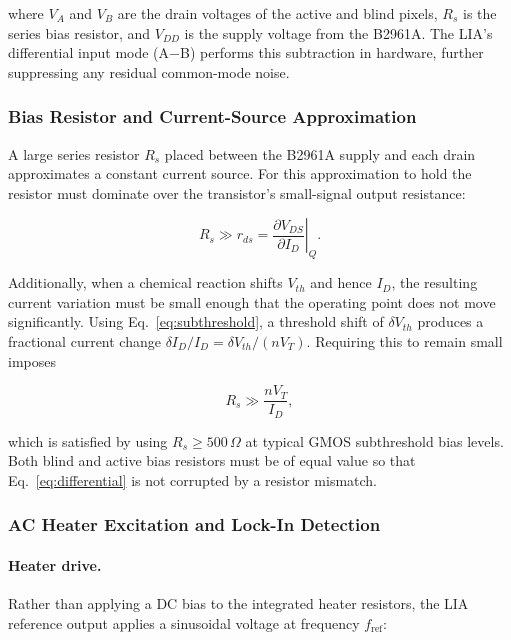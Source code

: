 \documentclass{report}
\begin{document}
where $V_A$ and $V_B$ are the drain voltages of the active and blind pixels,
$R_s$ is the series bias resistor, and $V_{DD}$ is the supply voltage from
the B2961A. The LIA's differential input mode (A$-$B) performs this
subtraction in hardware, further suppressing any residual common-mode noise.

\subsubsection{Bias Resistor and Current-Source Approximation}

A large series resistor $R_s$ placed between the B2961A supply and each drain
approximates a constant current source. For this approximation to hold the
resistor must dominate over the transistor's small-signal output resistance:

\begin{equation}
  R_s \gg r_{ds} = \left.\frac{\partial V_{DS}}{\partial I_D}\right|_{Q}.
  \label{eq:current_source_cond}
\end{equation}

Additionally, when a chemical reaction shifts $V_{th}$ and hence $I_D$, the
resulting current variation must be small enough that the operating point does
not move significantly. Using Eq.~\eqref{eq:subthreshold}, a threshold shift
of $\delta V_{th}$ produces a fractional current change
$\delta I_D / I_D = \delta V_{th} / (n V_T)$.
Requiring this to remain small imposes

\begin{equation}
  R_s \gg \frac{n V_T}{I_D},
  \label{eq:bias_stability}
\end{equation}

which is satisfied by using $R_s \geq 500\,\Omega$ at typical GMOS
subthreshold bias levels. Both blind and active bias resistors must be of
equal value so that Eq.~\eqref{eq:differential} is not corrupted by a
resistor mismatch.

\subsubsection{AC Heater Excitation and Lock-In Detection}

\paragraph{Heater drive.}
Rather than applying a DC bias to the integrated heater resistors, the LIA
reference output applies a sinusoidal voltage at frequency $f_{\mathrm{ref}}$:
\end{document}
